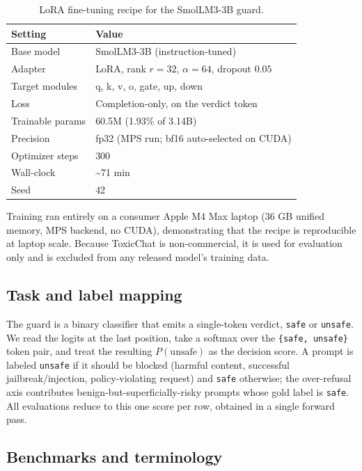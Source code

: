 \documentclass[sigconf,nonacm]{acmart}
\begin{document}
\begin{table}[t]
\small
\centering
\caption{LoRA fine-tuning recipe for the SmolLM3-3B guard.}
\label{tab:lora}
\begin{tabular}{ll}
\toprule
Setting & Value \\
\midrule
Base model & SmolLM3-3B (instruction-tuned) \\
Adapter & LoRA, rank $r=32$, $\alpha=64$, dropout $0.05$ \\
Target modules & q, k, v, o, gate, up, down \\
Loss & Completion-only, on the verdict token \\
Trainable params & 60.5M (1.93\% of 3.14B) \\
Precision & fp32 (MPS run; bf16 auto-selected on CUDA) \\
Optimizer steps & 300 \\
Wall-clock & \textasciitilde{}71 min \\
Seed & 42 \\
\bottomrule
\end{tabular}
\end{table}

Training ran entirely on a consumer Apple M4 Max laptop (36 GB unified memory, MPS backend, no CUDA), demonstrating that the recipe is reproducible at laptop scale. Because ToxicChat is non-commercial, it is used for evaluation only and is excluded from any released model's training data.

\subsection{Task and label mapping}
\label{sec:setup}

The guard is a binary classifier that emits a single-token verdict, \texttt{safe} or \texttt{unsafe}. We read the logits at the last position, take a softmax over the \texttt{\{safe, unsafe\}} token pair, and treat the resulting $P(\text{unsafe})$ as the decision score. A prompt is labeled \texttt{unsafe} if it should be blocked (harmful content, successful jailbreak/injection, policy-violating request) and \texttt{safe} otherwise; the over-refusal axis contributes benign-but-superficially-risky prompts whose gold label is \texttt{safe}. All evaluations reduce to this one score per row, obtained in a single forward pass.

\subsection{Benchmarks and terminology}
\end{document}
